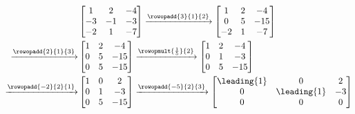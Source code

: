 \begin{align*}
&
\begin{bmatrix}
 1 & 2 & -4 \\
 -3 & -1 & -3 \\
 -2 & 1 & -7
\end{bmatrix}
%
\xrightarrow{\rowopadd{3}{1}{2}}
\begin{bmatrix}
 1 & 2 & -4 \\
 0 & 5 & -15 \\
 -2 & 1 & -7
\end{bmatrix}\\
%
\xrightarrow{\rowopadd{2}{1}{3}}
&
\begin{bmatrix}
 1 & 2 & -4 \\
 0 & 5 & -15 \\
 0 & 5 & -15
\end{bmatrix}
%
\xrightarrow{\rowopmult{\frac{1}{5}}{2}}
%
\begin{bmatrix}
 1 & 2 & -4 \\
 0 & 1 & -3 \\
 0 & 5 & -15
\end{bmatrix}\\
%
\xrightarrow{\rowopadd{-2}{2}{1}}
&
\begin{bmatrix}
 1 & 0 & 2 \\
 0 & 1 & -3 \\
 0 & 5 & -15
\end{bmatrix}
%
\xrightarrow{\rowopadd{-5}{2}{3}}
\begin{bmatrix}
 \leading{1} & 0 & 2 \\
 0 & \leading{1} & -3 \\
 0 & 0 & 0
\end{bmatrix}
%
\end{align*}
